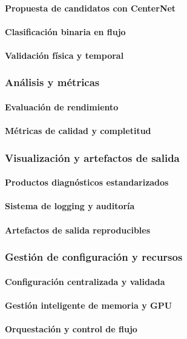 \paragraph{Propuesta de candidatos con CenterNet}
\paragraph{Clasificación binaria en flujo}
\paragraph{Validación física y temporal}

\subsubsection{Análisis y métricas}
\paragraph{Evaluación de rendimiento}
\paragraph{Métricas de calidad y completitud}

\subsubsection{Visualización y artefactos de salida}
\paragraph{Productos diagnósticos estandarizados}
\paragraph{Sistema de logging y auditoría}
\paragraph{Artefactos de salida reproducibles}

\subsubsection{Gestión de configuración y recursos}
\paragraph{Configuración centralizada y validada}
\paragraph{Gestión inteligente de memoria y GPU}
\paragraph{Orquestación y control de flujo}
